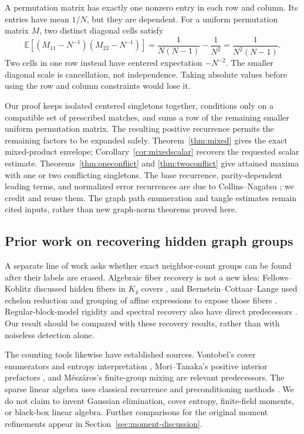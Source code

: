 \documentclass[11pt]{article}
\theoremstyle{definition}
\theoremstyle{remark}
\newcommand{\E}{\mathbb E}
\newcommand{\1}{\mathbf 1}
\begin{document}
A permutation matrix has exactly one nonzero entry in each row and
column. Its entries have mean $1/N$, but they are dependent. For a
uniform permutation matrix $M$, two distinct diagonal cells satisfy
\begin{equation}\label{eq:two}
\E[(M_{11}-N^{-1})(M_{22}-N^{-1})]
=\frac{1}{N(N-1)}-\frac1{N^2}
=\frac{1}{N^2(N-1)}.
\end{equation}
Two cells in one row instead have centered expectation $-N^{-2}$.
The smaller diagonal scale is cancellation, not independence. Taking
absolute values before using the row and column constraints would lose it.

Our proof keeps isolated centered singletons together, conditions only
on a compatible set of prescribed matches, and sums a row of the
remaining smaller uniform permutation matrix. The resulting positive
recurrence permits the remaining factors to be expanded safely.
Theorem~\ref{thm:mixed} gives the exact mixed-product envelope;
Corollary~\ref{cor:mixedscalar} recovers the requested scalar estimate.
Theorems~\ref{thm:oneconflict} and \ref{thm:twoconflict} give attained
maxima with one or two conflicting singletons. The base recurrence,
parity-dependent leading terms, and normalized error recurrences are due
to Collins--Nagatsu \cite[Proposition 3.3]{CN}; we credit and reuse them.
The graph path enumeration and tangle estimates remain cited inputs,
rather than new graph-norm theorems proved here.

\subsection{Prior work on recovering hidden graph groups}
A separate line of work asks whether exact neighbor-count groups can be
found after their labels are erased. Algebraic fiber recovery is not a
new idea: Fellows--Koblitz discussed hidden fibers in $K_4$ covers
\cite{rec:KidKrypto}, and Bernstein--Cottaar--Lange used echelon
reduction and grouping of affine expressions to expose those fibers
\cite{rec:BCL}. Regular-block-model rigidity and spectral recovery
also have direct predecessors \cite{rec:BDGHT,rec:Barucca,rec:KP,BDH}.
Our result should be compared with these recovery results, rather than
with noiseless detection alone.

The counting tools likewise have established sources. Vontobel's
cover enumerators and entropy interpretation \cite{rec:Vontobel},
Mori--Tanaka's positive interior prefactors \cite{rec:MoriTanaka},
and M\'esz\'aros's finite-group mixing \cite{rec:Meszaros} are relevant
predecessors. The sparse linear algebra uses classical recurrence and
preconditioning methods \cite{rec:Wiedemann,rec:Chen}. We do not claim
to invent Gaussian elimination, cover entropy, finite-field moments,
or black-box linear algebra. Further comparisons for the original
moment refinements appear in Section~\ref{sec:moment-discussion}.
\end{document}
